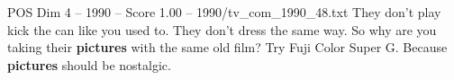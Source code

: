 \begin{textsample}{POS Dim 4 – 1990 – Score 1.00 – 1990/tv\_com\_1990\_48.txt}  \label{ex:f4_pos_026}
They don't play kick the can like you used to.
They don't dress the same way.
So why are you taking their \textbf{pictures} with the same old film?
Try Fuji Color Super G.
Because \textbf{pictures} should be nostalgic.

\end{textsample}
